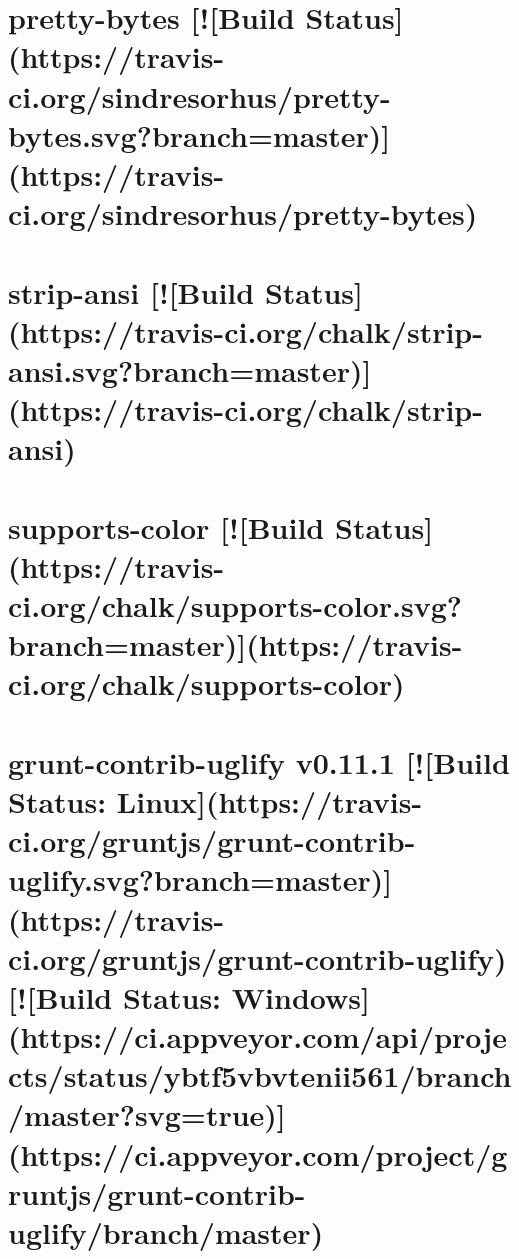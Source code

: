 \documentclass[twoside]{book}
\newcommand{\+}{\discretionary{\mbox{\scriptsize$\hookleftarrow$}}{}{}}
\begin{document}
\chapter{pretty-\/bytes \mbox{[}!\mbox{[}Build Status\mbox{]}(https\+://travis-\/ci.org/sindresorhus/pretty-\/bytes.svg?branch=master)\mbox{]}(https\+://travis-\/ci.org/sindresorhus/pretty-\/bytes)}
\label{md_app_web_node_modules_grunt-contrib-uglify_node_modules_pretty-bytes_readme}

\chapter{strip-\/ansi \mbox{[}!\mbox{[}Build Status\mbox{]}(https\+://travis-\/ci.org/chalk/strip-\/ansi.svg?branch=master)\mbox{]}(https\+://travis-\/ci.org/chalk/strip-\/ansi)}
\label{md_app_web_node_modules_grunt-contrib-uglify_node_modules_strip-ansi_readme}

\chapter{supports-\/color \mbox{[}!\mbox{[}Build Status\mbox{]}(https\+://travis-\/ci.org/chalk/supports-\/color.svg?branch=master)\mbox{]}(https\+://travis-\/ci.org/chalk/supports-\/color)}
\label{md_app_web_node_modules_grunt-contrib-uglify_node_modules_supports-color_readme}

\chapter{grunt-\/contrib-\/uglify v0.11.1 \mbox{[}!\mbox{[}Build Status\+: Linux\mbox{]}(https\+://travis-\/ci.org/gruntjs/grunt-\/contrib-\/uglify.svg?branch=master)\mbox{]}(https\+://travis-\/ci.org/gruntjs/grunt-\/contrib-\/uglify) \mbox{[}!\mbox{[}Build Status\+: Windows\mbox{]}(https\+://ci.appveyor.\+com/api/projects/status/ybtf5vbvtenii561/branch/master?svg=true)\mbox{]}(https\+://ci.appveyor.\+com/project/gruntjs/grunt-\/contrib-\/uglify/branch/master)}
\label{md_app_web_node_modules_grunt-contrib-uglify__r_e_a_d_m_e}

\end{document}
